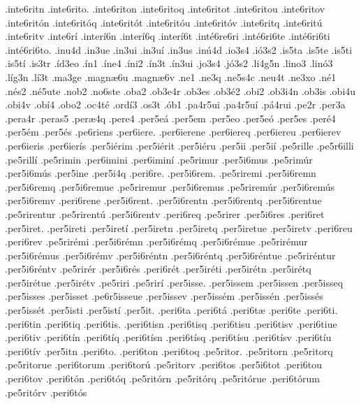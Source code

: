 {.inte6ritn
.inte6rito.
.inte6riton
.inte6ritoq
.inte6ritot
.inte6ritou
.inte6ritov
.inte6rit^^f3n
.inte6rit^^f3q
.inte6rit^^f3t
.inte6rit^^f3u
.inte6rit^^f3v
.inte6ritq
.inte6rit^^fa
.inte6ritv
.inte6r^^ed
.inter^^ed6n
.inter^^ed6q
.inter^^ed6t
.int^^e96re6ri
.int^^e96ri6te
.int^^e96ri6ti
.int^^e96ri6to.
.inu4d
.in3ue
.in3ui
.in3u^^ed
.in3us
.in^^fa4d
.io3s4
.i^^f33s2
.is5ta
.is5te
.is5ti
.is5t^^ed
.is3tr
.^^edd3eo
.^^edn1
.^^edne4
.^^edni2
.^^edn3t
.^^edn3ui
.jo3s4
.j^^f33s2
.li4g5n
.lino3
.lin^^f33
.l^^edg3n
.l^^ed3t
.ma3ge
.magn^^e66u
.magn^^e66v
.ne1
.ne3q
.ne5s4c
.neu4t
.ne3xo
.n^^e91
.n^^e9s2
.n^^e95ute
.nob2
.no6ste
.oba2
.ob3e4r
.ob3es
.ob3^^e92
.obi2
.ob3i4n
.ob3is
.obi4u
.obi4v
.ob^^ed4
.obo2
.oc4t^^e9
.ord^^ed3
.os3t
.^^f3b1
.pa4r5ui
.pa4r5u^^ed
.p^^e14rui
.pe2r
.per3a
.pera4r
.peras5
.per^^e64q
.pere4
.per5e^^e1
.per5em
.per5eo
.per5e^^f3
.per5es
.per^^e94
.per5^^e9m
.per5^^e9s
.pe6riens
.per6iere.
.per6ierene
.per6iereq
.per6iereu
.per6ierev
.per6ieris
.per6ier^^eds
.per5i^^e9rim
.per5i^^e9rit
.per5i^^e9ru
.per5ii
.per5i^^ed
.pe5rille
.pe5r6illi
.pe5rill^^ed
.pe5rimin
.per6imini
.per6imin^^ed
.pe5rimur
.per5i6mus
.pe5rim^^far
.per5i6m^^fas
.per5ine
.per5i4q
.peri6re.
.per5i6rem.
.pe5riremi
.per5i6remn
.per5i6remq
.per5i6remue
.pe5riremur
.per5i6remus
.pe5rirem^^far
.per5i6rem^^fas
.per5i6remv
.peri6rene
.per5i6rent.
.per5i6rentn
.per5i6rentq
.per5i6rentue
.pe5rirentur
.pe5rirent^^fa
.per5i6rentv
.peri6req
.pe5rirer
.per5i6res
.peri6ret
.per5iret.
.per5ireti
.per5iret^^ed
.per5iretn
.per5iretq
.per5iretue
.per5iretv
.peri6reu
.peri6rev
.pe5rir^^e9mi
.per5i6r^^e9mn
.per5i6r^^e9mq
.per5i6r^^e9mue
.pe5rir^^e9mur
.per5i6r^^e9mus
.per5i6r^^e9mv
.per5i6r^^e9ntn
.per5i6r^^e9ntq
.per5i6r^^e9ntue
.pe5rir^^e9ntur
.per5i6r^^e9ntv
.pe5rir^^e9r
.per5i6r^^e9s
.peri6r^^e9t
.per5ir^^e9ti
.per5ir^^e9tn
.per5ir^^e9tq
.per5ir^^e9tue
.per5ir^^e9tv
.pe5riri
.pe5rir^^ed
.per5isse.
.per5issem
.per5issen
.per5isseq
.per5isses
.per5isset
.pe6r5isseue
.per5issev
.per5iss^^e9m
.per5iss^^e9n
.per5iss^^e9s
.per5iss^^e9t
.per5isti
.per5ist^^ed
.per5it.
.peri6ta
.peri6t^^e1
.peri6t^^e6
.peri6te
.peri6ti.
.peri6tin
.peri6tiq
.peri6tis.
.peri6tisn
.peri6tisq
.peri6tisu
.peri6tisv
.peri6tiue
.peri6tiv
.peri6t^^edn
.peri6t^^edq
.peri6t^^edsn
.peri6t^^edsq
.peri6t^^edsu
.peri6t^^edsv
.peri6t^^edu
.peri6t^^edv
.per5itn
.peri6to.
.peri6ton
.peri6toq
.pe5ritor.
.pe5ritorn
.pe5ritorq
.pe5ritorue
.peri6torum
.peri6tor^^fa
.pe5ritorv
.peri6tos
.per5i6tot
.peri6tou
.peri6tov
.peri6t^^f3n
.peri6t^^f3q
.pe5rit^^f3rn
.pe5rit^^f3rq
.pe5rit^^f3rue
.peri6t^^f3rum
.pe5rit^^f3rv
.peri6t^^f3s
}
